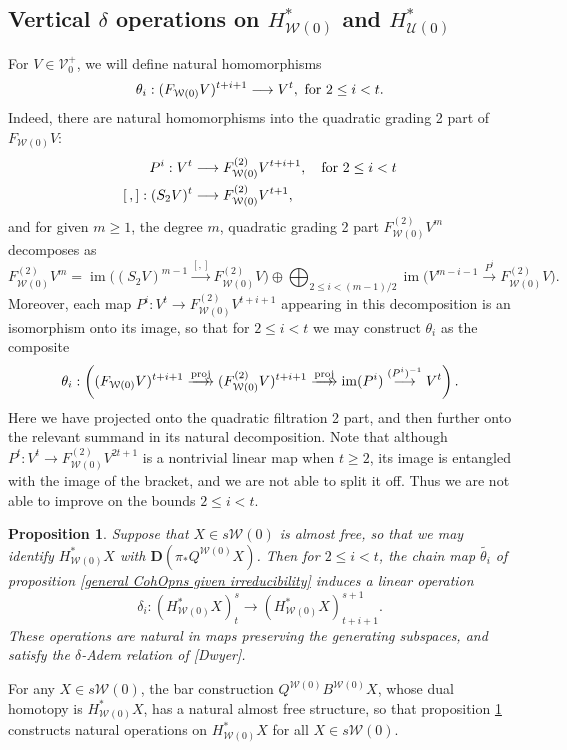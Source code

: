 \documentclass[11pt]{amsart}
\theoremstyle{plain}
\newtheorem{prop}[thm]{Proposition}
\theoremstyle{definition}
\DeclareMathOperator{\im}{im}
\renewcommand{\to}{\longrightarrow}
\newcommand{\calW}{\mathcal{W}}
\newcommand{\calU}{\mathcal{U}}
\newcommand{\calV}{\mathcal{V}}
\newcommand{\calw}{\mathcal{W}}
\theoremstyle{plain}
\newcommand{\vect}[2]{\calV^{#1}_{#2}}
\newcommand{\dual}{\mathbf{D}}
\begin{document}
\begin{Cohomology operations for all unstable Lie algebras}
\subsection{Vertical $\delta$ operations on $H^*_{\calW(0)}$ and $H^*_{\calU(0)}$}
For $V\in \vect{+}{0}$, we will define natural homomorphisms
\[\theta_i:(F_{\calW(0)}V)^{t+i+1}\to V^{t}, \textup{ for $2\leq i<t$}.\]
Indeed, there are natural homomorphisms into the quadratic grading 2 part of $F_{\calW(0)}V$:
\begin{align*}
P^i:V^{t}&\to F_{\calW(0)}^{(2)}V^{t+i+1}, \textup{\quad  for $2\leq i<t$}\\
[\,,]:(S_2V)^{t}&\to F_{\calW(0)}^{(2)}V^{t+1},
\end{align*}
and for given $m\geq1$, the degree $m$, quadratic grading 2 part $F_{\calW(0)}^{(2)}V^m$ decomposes as
%
\[F_{\calW(0)}^{(2)}V^{m}=%
\im \bigl((S_2V)^{m-1}\overset{[,]}{\to} F_{\calW(0)}^{(2)}V\bigr)%
\oplus\bigoplus_{\!\!\!\!\!\!2\leq i< (m-1)/2\!\!\!\!\!\!}\im \bigl(V^{m-i-1}\overset{P^i}{\to}F_{\calW(0)}^{(2)}V\bigr).\]
Moreover, each map $P^i:V^t\to F_{\calW(0)}^{(2)}V^{t+i+1}$ appearing in this decomposition is an isomorphism onto its image, so that for $2\leq i <t$ we may construct $\theta_i$ as the composite
\[\theta_i:\left((F_{\calW(0)}V)^{t+i+1}\overset{\textup{proj}}{\makebox[.06ex][l]{$\to$}\to} (F_{\calW(0)}^{(2)}V)^{t+i+1}\overset{\textup{proj}}{\makebox[.06ex][l]{$\to$}\to} \im (P^i)\overset{(P^i)^{-1}}{\to}V^{t}\right).\]
Here we have projected onto the quadratic filtration 2 part, and then further onto the relevant summand in its natural decomposition. Note that although $P^t:V^t\to F_{\calW(0)}^{(2)}V^{2t+1}$ is a nontrivial linear map when $t\geq2$, its image is entangled with the image of the bracket, and we are not able to split it off. Thus we are not able to improve on the bounds $2\leq i< t$.
\begin{prop}\label{operations on goerss homology}
Suppose that $X\in s\calW(0)$ is almost free, so that we may identify $H^*_{\calW(0)}X$ with $\dual(\pi_*Q^{\calw(0)}X)$. Then for $2\leq i <t$, the chain map $\widetilde{\theta_i}$ of proposition \ref{general CohOpns given irreducibility} induces a linear operation
\[\delta_i:(H^*_{\calW(0)}X)^{s}_t\to (H^*_{\calW(0)}X)^{s+1}_{t+i+1}.\] 
These operations are natural in maps preserving the generating subspaces, and satisfy the $\delta$-Adem relation of [Dwyer].
\end{prop}
\noindent For any $X\in s\calW(0)$, the bar construction $Q^{\calW(0)}B^{\calW(0)}X$, whose dual homotopy is $H^*_{\calW(0)}X$, has a natural almost free structure, so that proposition \ref{operations on goerss homology} constructs natural  operations on $H^*_{\calw(0)}X$ for all $X\in s\calw(0)$.


\end{Cohomology operations for all unstable Lie algebras}
\end{document}
